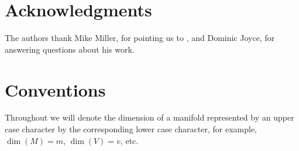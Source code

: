 \section*{Acknowledgments}

The authors thank Mike Miller, for pointing us to \cite{Lipy14}, and Dominic Joyce, for answering questions about his work.

\section*{Conventions}

Throughout we will denote the dimension of a manifold represented by an upper case character by the corresponding lower case character, for example, $\dim(M)=m$, $\dim(V)=v$, etc.